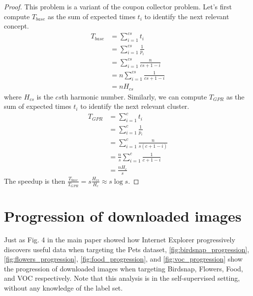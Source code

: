 \begin{proof}
This problem is a variant of the coupon collector problem. Let's first compute $T_{base}$ as the sum of expected times $t_i$ to identify the next relevant concept. 
\begin{align}
    T_{base} &= \sum_{i=1}^{cs} t_i \\
             &= \sum_{i=1}^{cs} \frac{1}{p_i} \\
             &= \sum_{i=1}^{cs} \frac{n}{cs + 1 - i} \\
             &= n \sum_{i=1}^{cs} \frac{1}{cs + 1 - i} \\
             &= n H_{cs}
\end{align}
where $H_{cs}$ is the $cs$th harmonic number. Similarly, we can compute $T_{GPR}$ as the sum of expected times $t_i$ to identify the next relevant cluster.  
\begin{align}
    T_{GPR} &= \sum_{i=1}^{c} t_i \\
             &= \sum_{i=1}^{c} \frac{1}{p_i} \\
             &= \sum_{i=1}^{c} \frac{n}{s (c + 1 - i)} \\
             &= \frac{n}{s} \sum_{i=1}^{c} \frac{1}{c + 1 - i} \\
             &= \frac{nH_{c}}{s}
\end{align}
The speedup is then $\displaystyle \frac{T_{base}}{T_{GPR}} = s \frac{H_{cs}}{H_c} \approx s \log s$.
\end{proof}

\section{Progression of downloaded images}
\label{sec:progression_downloaded_imgs}
Just as Fig. 4 in the main paper showed how Internet Explorer progressively discovers useful data when targeting the Pets dataset, \cref{fig:birdsnap_progression}, \cref{fig:flowers_progression}, \cref{fig:food_progression}, and \cref{fig:voc_progression} show the progression of downloaded images when targeting Birdsnap, Flowers, Food, and VOC respectively. Note that this analysis is in the self-supervised setting, without any knowledge of the label set. 

